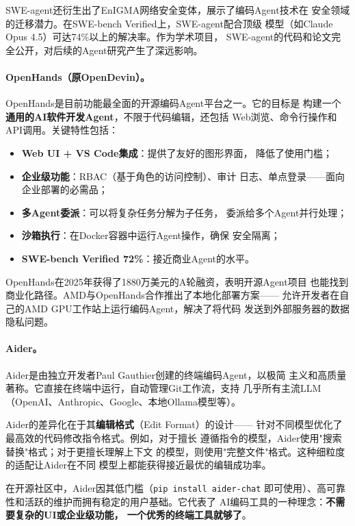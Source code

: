 SWE-agent还衍生出了EnIGMA网络安全变体，展示了编码Agent技术在
安全领域的迁移潜力。在SWE-bench Verified上，SWE-agent配合顶级
模型（如Claude Opus 4.5）可达74\%以上的解决率。作为学术项目，
SWE-agent的代码和论文完全公开，对后续的Agent研究产生了深远影响。

\paragraph{OpenHands（原OpenDevin）。}
OpenHands是目前功能最全面的开源编码Agent平台之一。它的目标是
构建一个\textbf{通用的AI软件开发Agent}，不限于代码编辑，还包括
Web浏览、命令行操作和API调用。关键特性包括：

\begin{itemize}
  \item \textbf{Web UI + VS Code集成}：提供了友好的图形界面，
    降低了使用门槛；
  \item \textbf{企业级功能}：RBAC（基于角色的访问控制）、审计
    日志、单点登录——面向企业部署的必需品；
  \item \textbf{多Agent委派}：可以将复杂任务分解为子任务，
    委派给多个Agent并行处理；
  \item \textbf{沙箱执行}：在Docker容器中运行Agent操作，确保
    安全隔离；
  \item \textbf{SWE-bench Verified 72\%}：接近商业Agent的水平。
\end{itemize}

OpenHands在2025年获得了1880万美元的A轮融资，表明开源Agent项目
也能找到商业化路径。AMD与OpenHands合作推出了本地化部署方案——
允许开发者在自己的AMD GPU工作站上运行编码Agent，解决了将代码
发送到外部服务器的数据隐私问题。

\paragraph{Aider。}
Aider是由独立开发者Paul Gauthier创建的终端编码Agent，以极简
主义和高质量著称。它直接在终端中运行，自动管理Git工作流，支持
几乎所有主流LLM（OpenAI、Anthropic、Google、本地Ollama模型等）。

Aider的差异化在于其\textbf{编辑格式}（Edit Format）的设计——
针对不同模型优化了最高效的代码修改指令格式。例如，对于擅长
遵循指令的模型，Aider使用"搜索替换"格式；对于更擅长理解上下文
的模型，则使用"完整文件"格式。这种细粒度的适配让Aider在不同
模型上都能获得接近最优的编辑成功率。

在开源社区中，Aider因其低门槛（\texttt{pip install aider-chat}
即可使用）、高可靠性和活跃的维护而拥有稳定的用户基础。它代表了
AI编码工具的一种理念：\textbf{不需要复杂的UI或企业级功能，
一个优秀的终端工具就够了}。

